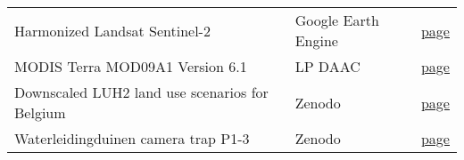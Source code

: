 \begin{table}
\begin{tabular}{lll}
Harmonized Landsat Sentinel-2 & Google Earth Engine & \href{https://developers.google.com/earth-engine/datasets/catalog/NASA_HLS_HLSS30_v002}{page} \\
MODIS Terra MOD09A1 Version 6.1 & LP DAAC & \href{https://lpdaac.usgs.gov/products/mod09a1v061/}{page} \\
Downscaled LUH2 land use scenarios for Belgium & Zenodo & \href{https://zenodo.org/records/8319440}{page} \\
Waterleidingduinen camera trap P1-3 & Zenodo & \href{https://zenodo.org/records/11440456}{page} \\
\bottomrule
\end{tabular}
\end{table}
